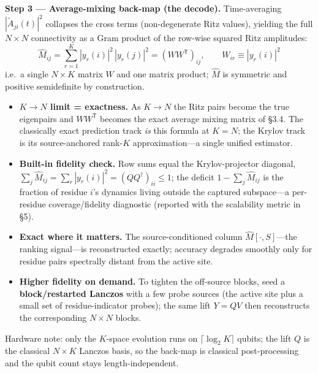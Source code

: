 \documentclass[11pt,a4paper]{article}
\newcommand{\mhat}{\hat{M}}
\newcommand{\lead}[1]{\textbf{#1}}
\newcommand{\note}[1]{{\color{grey}\small #1}}
\begin{document}
\smallskip
\lead{Step 3 --- Average-mixing back-map (the decode).} Time-averaging $|\tilde A_{ji}(t)|^2$ collapses the cross terms (non-degenerate Ritz values), yielding the full $N\times N$ connectivity as a Gram product of the row-wise squared Ritz amplitudes:
\begin{equation*}
\boxed{\;\mhat_{ij}=\sum_{r=1}^{K}|y_r(i)|^2\,|y_r(j)|^2=(WW^{\mathsf T})_{ij},\qquad W_{ir}\equiv|y_r(i)|^2\;}
\end{equation*}
i.e.\ a single $N\times K$ matrix $W$ and one matrix product; $\mhat$ is symmetric and positive semidefinite by construction.
\begin{itemize}
\item \lead{$K\to N$ limit = exactness.} As $K\to N$ the Ritz pairs become the true eigenpairs and $WW^{\mathsf T}$ becomes the exact average mixing matrix of \S3.4. The classically exact prediction track \emph{is} this formula at $K=N$; the Krylov track is its source-anchored rank-$K$ approximation---a single unified estimator.
\item \lead{Built-in fidelity check.} Row sums equal the Krylov-projector diagonal, $\sum_j \mhat_{ij}=\sum_r|y_r(i)|^2=(QQ^{\dagger})_{ii}\le 1$; the deficit $1-\sum_j\mhat_{ij}$ is the fraction of residue $i$'s dynamics living outside the captured subspace---a per-residue coverage/fidelity diagnostic (reported with the scalability metric in \S5).
\item \lead{Exact where it matters.} The source-conditioned column $\mhat[\cdot,S]$---the ranking signal---is reconstructed exactly; accuracy degrades smoothly only for residue pairs spectrally distant from the active site.
\item \lead{Higher fidelity on demand.} To tighten the off-source blocks, seed a \lead{block/restarted Lanczos} with a few probe sources (the active site plus a small set of residue-indicator probes); the same lift $Y=QV$ then reconstructs the corresponding $N\times N$ blocks.
\end{itemize}
\note{Hardware note: only the $K$-space evolution runs on $\lceil\log_2 K\rceil$ qubits; the lift $Q$ is the classical $N\times K$ Lanczos basis, so the back-map is classical post-processing and the qubit count stays length-independent.}
\end{document}
